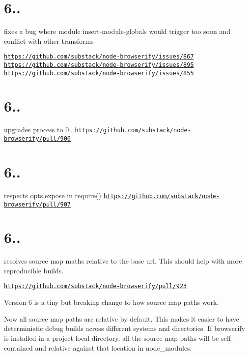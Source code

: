 \section*{6..}

fixes a bug where module insert-\/module-\/globals would trigger too soon and conflict with other transforms

\href{https://github.com/substack/node-browserify/issues/867}{\tt https\+://github.\+com/substack/node-\/browserify/issues/867} \href{https://github.com/substack/node-browserify/issues/895}{\tt https\+://github.\+com/substack/node-\/browserify/issues/895} \href{https://github.com/substack/node-browserify/issues/855}{\tt https\+://github.\+com/substack/node-\/browserify/issues/855}

\section*{6..}

upgrades process to 0.. \href{https://github.com/substack/node-browserify/pull/906}{\tt https\+://github.\+com/substack/node-\/browserify/pull/906}

\section*{6..}

respects opts.\+expose in require() \href{https://github.com/substack/node-browserify/pull/907}{\tt https\+://github.\+com/substack/node-\/browserify/pull/907}

\section*{6..}

resolves source map maths relative to the base url. This should help with more reproducible builds.

\href{https://github.com/substack/node-browserify/pull/923}{\tt https\+://github.\+com/substack/node-\/browserify/pull/923}

Version 6 is a tiny but breaking change to how source map paths work.

Now all source map paths are relative by default. This makes it easier to have deterministic debug builds across different systems and directories. If browserify is installed in a project-\/local directory, all the source map paths will be self-\/contained and relative against that location in node\+\_\+modules.

